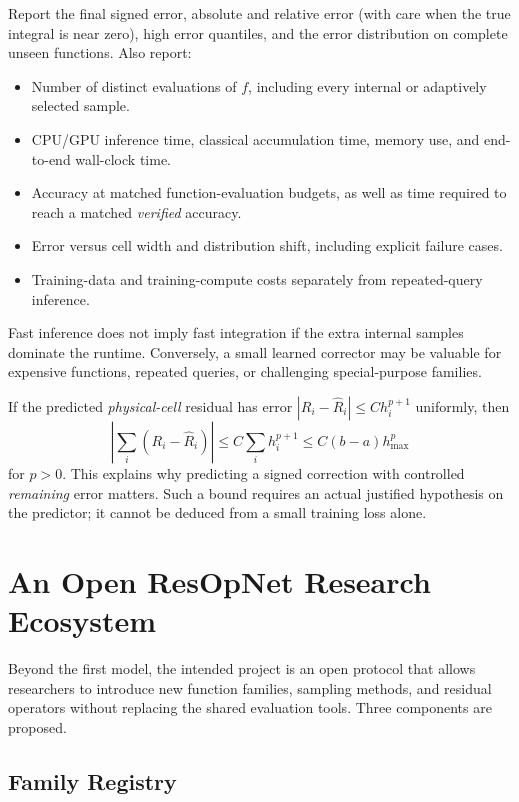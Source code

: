 Report the final signed error, absolute and relative error (with care
when the true integral is near zero), high error quantiles, and the error
distribution on complete unseen functions. Also report:
\begin{itemize}
    \item Number of distinct evaluations of $f$, including every
          internal or adaptively selected sample.
    \item CPU/GPU inference time, classical accumulation time,
          memory use, and end-to-end wall-clock time.
    \item Accuracy at matched function-evaluation budgets, as well as
          time required to reach a matched \emph{verified} accuracy.
    \item Error versus cell width and distribution shift, including
          explicit failure cases.
    \item Training-data and training-compute costs separately from
          repeated-query inference.
\end{itemize}
Fast inference does not imply fast integration if the extra internal
samples dominate the runtime. Conversely, a small learned corrector may
be valuable for expensive functions, repeated queries, or challenging
special-purpose families.

If the predicted \emph{physical-cell} residual has error
$|R_i-\widehat R_i|\leq C h_i^{p+1}$ uniformly, then
\[
    \left|\sum_i(R_i-\widehat R_i)\right|
    \leq C\sum_i h_i^{p+1}
    \leq C(b-a)h_{\max}^{p}
\]
for $p>0$. This explains why predicting a signed correction with
controlled \emph{remaining} error matters. Such a bound requires an
actual justified hypothesis on the predictor; it cannot be deduced from
a small training loss alone.

\section{An Open ResOpNet Research Ecosystem}
\label{sec:resop-ecosystem}

Beyond the first model, the intended project is an open protocol that
allows researchers to introduce new function families, sampling methods,
and residual operators without replacing the shared evaluation tools.
Three components are proposed.

\subsection{Family Registry}

